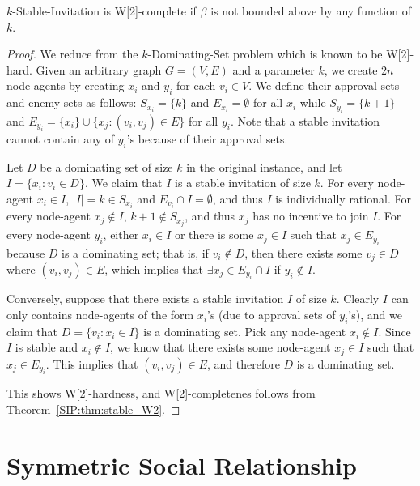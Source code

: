\begin{theorem} \label{SIP:thm:stable_W2hard_beta}
	$k$-Stable-Invitation is W[2]-complete if $\beta$ is not bounded above by any function of $k$.
\end{theorem}
\begin{proof}
	We reduce from the $k$-Dominating-Set problem which is known to be W[2]-hard.
	Given an arbitrary graph $G = (V, E)$ and a parameter $k$, we create $2n$ node-agents by creating $x_i$ and $y_i$ for each $v_i\in V$. We define their approval sets and enemy sets as follows: $S_{x_i} = \{k\}$ and $E_{x_i} = \emptyset$ for all $x_i$ while $S_{y_i} = \{k+1\}$ and $E_{y_i} = \{x_i\} \cup \{x_j : (v_i, v_j)\in E\}$ for all $y_i$. Note that a stable invitation cannot contain any of $y_i$'s because of their approval sets.
	
	Let $D$ be a dominating set of size $k$ in the original instance, and let $I = \{x_i : v_i \in D\}$. 
	We claim that $I$ is a stable invitation of size $k$. 
	For every node-agent $x_i\in I$, $|I| = k \in S_{x_i}$ and $E_{v_i} \cap I = \emptyset$, and thus $I$ is individually rational. 
	For every node-agent $x_j \not\in I$, $k+1 \not\in S_{x_j}$, and thus $x_j$ has no incentive to join $I$. 
	For every node-agent $y_i$, either $x_i\in I$ or there is some $x_j\in I$ such that $x_j \in E_{y_i}$ because $D$ is a dominating set; that is, if $v_i \not\in D$, then there exists some $v_j\in D$ where $(v_i, v_j) \in E$, which implies that $\exists x_j \in E_{y_i} \cap I$ if $y_i\not\in I$. 
	
	Conversely, suppose that there exists a stable invitation $I$ of size $k$. 
	Clearly $I$ can only contains node-agents of the form $x_i$'s (due to approval sets of $y_i$'s), and we claim that $D = \{v_i : x_i \in I\}$ is a dominating set. 
	Pick any node-agent $x_i\not \in I$. Since $I$ is stable and $x_i\not\in I$, we know that there exists some node-agent $x_j\in I$ such that $x_j\in E_{y_i}$. This implies that $(v_i, v_j) \in E$, and therefore $D$ is a dominating set. 
	
	This shows W[2]-hardness, and W[2]-completenes follows from Theorem~\ref{SIP:thm:stable_W2}.
\end{proof}







\section{Symmetric Social Relationship} \label{SIP:sec:symm}

